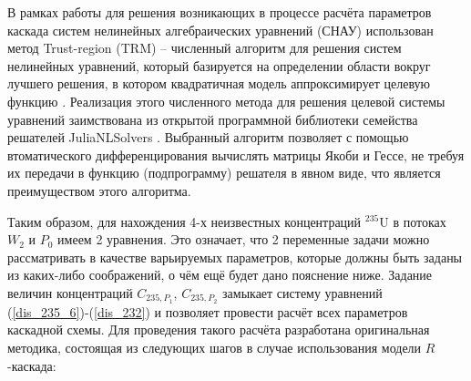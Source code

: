 В рамках работы для решения возникающих в процессе расчёта параметров каскада систем нелинейных алгебраических уравнений (СНАУ) использован метод Trust-region (TRM) -- численный алгоритм для решения систем нелинейных уравнений, который базируется на определении области вокруг лучшего решения, в котором квадратичная модель аппроксимирует целевую функцию \cite{NumericalOptimization2006}. Реализация этого численного метода для решения целевой системы уравнений заимствована из открытой программной библиотеки семейства решателей JuliaNLSolvers \cite{mogensenJuliaNLSolversNLsolveJl2020}. Выбранный алгоритм позволяет с помощью втоматического дифференцирования вычислять матрицы Якоби и Гессе, не требуя их передачи в функцию (подпрограмму) решателя в явном виде, что является преимуществом этого алгоритма.


Таким образом, для нахождения 4-х неизвестных концентраций $^{235}$U в потоках $W_2$ и $P_0$ имеем 2 уравнения. Это означает, что 2 переменные задачи можно рассматривать в качестве варьируемых параметров, которые должны быть заданы из каких-либо соображений, о чём ещё будет дано пояснение ниже. Задание величин концентраций $C_{235,{P_1}}$, $C_{235,{P_2}}$ замыкает систему уравнений (\ref{dis_235_6})-(\ref{dis_232}) и позволяет провести расчёт всех параметров каскадной схемы. Для проведения такого расчёта разработана оригинальная методика, состоящая из следующих шагов в случае использования модели $R$-каскада:

